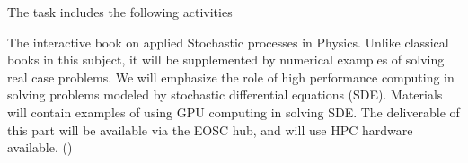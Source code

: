 \begin{task}[
  title=Online resources for open science,
  id=online-resources,
  lead=INSERM,
  PM=14,
  wphases={0-48},
  partners={CDS,EP,QS,SIL,SRL,UPSUD,WTT,XFEL}
]
  The task includes the following activities
  \begin{compactitem}
  \item The interactive book on applied Stochastic processes in Physics. Unlike classical books in this subject, it will be supplemented by numerical examples of solving real case problems. We will emphasize the
role of high performance computing in solving problems modeled by stochastic differential equations (SDE). Materials will contain examples of using GPU computing in solving SDE. The deliverable of this part will be available via the EOSC hub, and will use HPC hardware available. ()
  \end{compactitem}
\end{task}
